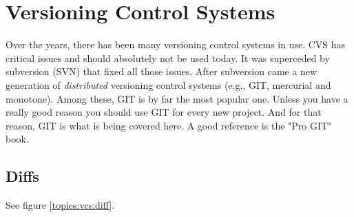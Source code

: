 \section{Versioning Control Systems}


Over the years, there has been many versioning control systems in use. CVS has critical issues and should absolutely not be used today. It was superceded by subversion (SVN) that fixed all those issues. After subversion came a new generation of \textsl{distributed} versioning control systems (e.g., GIT, mercurial and monotone). Among these, GIT is by far the most popular one. Unless you have a really good reason you should use GIT for every new project. And for that reason, GIT is what is being covered here. A good reference is the "Pro GIT" book\cite{progit}.

\subsection{Diffs}

See figure \ref{topics:vcs:diff}.

